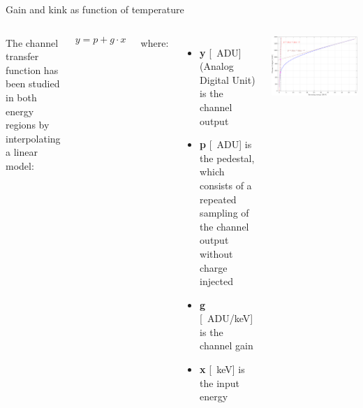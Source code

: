 \documentclass[aspectratio=169,xcolor=dvipsnames,handout]{beamer} %
\begin{document}
\begin{frame}{Gain and kink as function of temperature}
\fontsize{8.5pt}{1}\selectfont
    \begin{columns}
        \addtolength{\leftmargini}{\labelsep}

        \vspace{0.15cm}
        The channel transfer function has been studied in both energy regions by interpolating a linear model:
        \vskip0.2cm
        
        \begin{equation*}
            y = p + g \cdot x
        \end{equation*}

        \vspace{-0.1cm}
        where:
        
        \begin{itemize}
            \itemsep0em
            \item \textbf{y} [\SI{}{ADU}] (Analog Digital Unit) is the channel output
            \item \textbf{p} [\SI{}{ADU}] is the pedestal, which consists of a repeated sampling of the channel output without charge injected
            \item \textbf{g} [\SI{}{ADU/\kilo\electronvolt}] is the channel gain
            \item \textbf{x} [\SI{}{\kilo\electronvolt}] is the input energy
        \end{itemize}

        \vspace{-0.1cm}
        \begin{center}
            \includegraphics[height=0.42\textheight]{images/temperature_effects/fdt_calcolo_kink.pdf}
        \end{center}
        \vspace{0.05cm}


\end{columns}
\end{frame}
\end{document}
